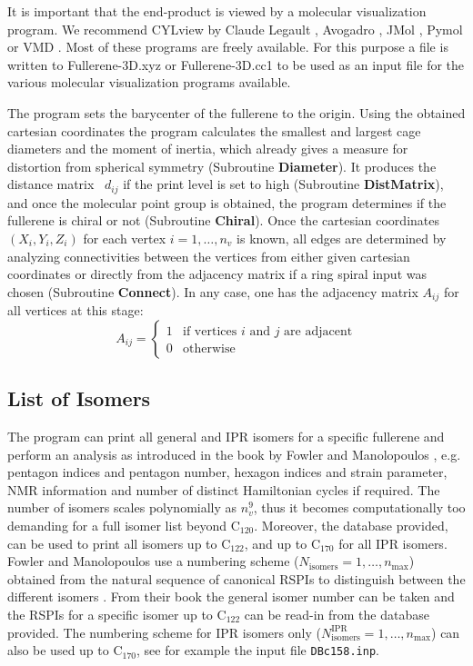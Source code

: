 \documentclass[article,a4paper,twoside]{memoir}
\newcommand{\C}[1]{\ensuremath{\mathrm{C}_{#1}}}
\newcommand{\filename}[1]{\texttt{#1}}
\newcommand{\funname}[1]{{\color{blue}\textbf{#1}}}
\begin{document}
It is important that the end-product is viewed by a molecular visualization program. 
We recommend CYLview by Claude Legault \cite{CYLview}, Avogadro \cite{Avogadro}, JMol \cite{JMol}, Pymol \cite{Pymol} or VMD \cite{vmd}. 
Most of these programs are freely available.  For this purpose a file is written to Fullerene-3D.xyz or Fullerene-3D.cc1 to be used as an input file 
for the various molecular visualization programs available.

The program sets the barycenter of the fullerene 
to the origin. Using the obtained cartesian coordinates the program calculates the smallest and largest cage diameters and the
moment of inertia, which already gives a measure for distortion from spherical symmetry (Subroutine \funname{Diameter}). 
It produces the distance matrix~ $d_{ij}$ if the print level is set to high (Subroutine \funname{DistMatrix}), and once the 
molecular point group is obtained, the program determines if the fullerene is chiral or not (Subroutine \funname{Chiral}).
Once the cartesian coordinates $(X_i, Y_i, Z_i)$ for each vertex $i=1,\dots, n_v$ is known, all edges are determined by 
analyzing connectivities between the vertices from either given cartesian coordinates or directly from the adjacency matrix 
if a ring spiral input was chosen (Subroutine \funname{Connect}). In any case, one has the adjacency matrix $A_{ij}$ for all vertices at this stage:
\begin{equation}
  \label{eq:adjacencymatrix}
  A_{ij} =
  \begin{cases}
    1 & \text{if vertices $i$ and $j$ are adjacent}\\
    0 & \text{otherwise}
  \end{cases}
\end{equation}

\subsection{List of Isomers}
The program can print all general and IPR isomers for a specific fullerene and perform an analysis as introduced 
in the book by Fowler and Manolopoulos \cite{Atlas}, e.g. pentagon indices and 
pentagon number, hexagon indices and strain parameter, NMR information and number of distinct Hamiltonian cycles if 
required. The number of isomers scales polynomially as $n_v^9$, thus it becomes computationally
too demanding for a full isomer list beyond \C{120}. Moreover, the database provided, can be used to print all isomers up to 
\C{122}, and up to \C{170} for all IPR isomers. Fowler and Manolopoulos use a numbering scheme ($N_\mathrm{isomers}= 1,\dots, n_\mathrm{max}$) 
obtained from the natural sequence of canonical RSPIs to distinguish between the different isomers \cite{Atlas}. From their book \cite{Atlas} the
general isomer number can be taken and the RSPIs for a specific isomer up to \C{122} can be read-in from the database provided. 
The numbering scheme for IPR isomers only ($N_\mathrm{isomers}^\mathrm{IPR}= 1,\dots, n_\mathrm{max}$) can also be used up to \C{170}, 
see for example the input file \filename{DBc158.inp}.
\end{document}
